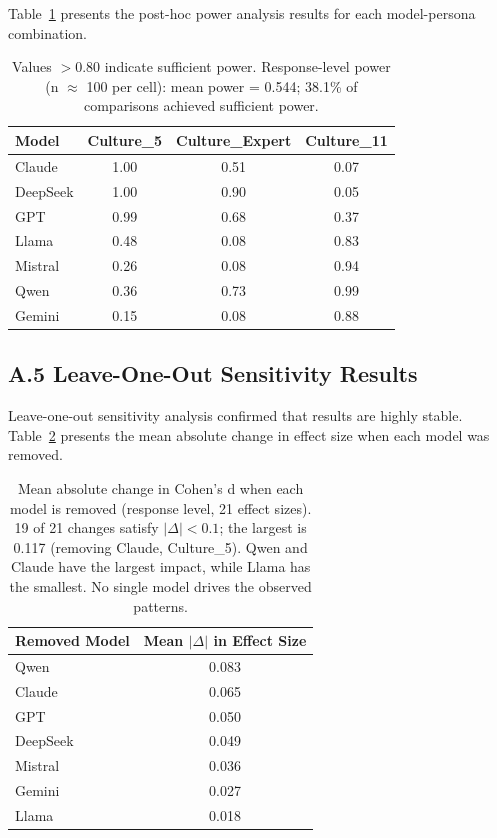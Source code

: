 \documentclass{article}
\begin{document}
Table~\ref{tab:power_novelty_full} presents the post-hoc power analysis results for each model-persona combination.

\begin{table}[H]
\centering
\caption{Post-hoc Power Analysis for Novelty by Model and Persona}
\label{tab:power_novelty_full}
\begin{tabular}{lccc}
\toprule
Model & Culture\_5 & Culture\_Expert & Culture\_11 \\
\midrule
Claude & 1.00 & 0.51 & 0.07 \\
DeepSeek & 1.00 & 0.90 & 0.05 \\
GPT & 0.99 & 0.68 & 0.37 \\
Llama & 0.48 & 0.08 & 0.83 \\
Mistral & 0.26 & 0.08 & 0.94 \\
Qwen & 0.36 & 0.73 & 0.99 \\
Gemini & 0.15 & 0.08 & 0.88 \\
\bottomrule
\end{tabular}
\caption*{\footnotesize Values $>0.80$ indicate sufficient power. Response-level power (n $\approx$ 100 per cell): mean power = 0.544; 38.1\% of comparisons achieved sufficient power.}
\end{table}

\newpage
\subsection*{A.5 Leave-One-Out Sensitivity Results}

Leave-one-out sensitivity analysis confirmed that results are highly stable. Table~\ref{tab:loo_novelty} presents the mean absolute change in effect size when each model was removed.

\begin{table}[H]
\centering
\caption{Leave-One-Out Sensitivity Analysis for Novelty}
\label{tab:loo_novelty}
\begin{tabular}{lc}
\toprule
Removed Model & Mean $|\Delta|$ in Effect Size \\
\midrule
Qwen & 0.083 \\
Claude & 0.065 \\
GPT & 0.050 \\
DeepSeek & 0.049 \\
Mistral & 0.036 \\
Gemini & 0.027 \\
Llama & 0.018 \\
\bottomrule
\end{tabular}
\caption*{\footnotesize Mean absolute change in Cohen's d when each model is removed (response level, 21 effect sizes). 19 of 21 changes satisfy $|\Delta| < 0.1$; the largest is 0.117 (removing Claude, Culture\_5). Qwen and Claude have the largest impact, while Llama has the smallest. No single model drives the observed patterns.}
\end{table}
\end{document}
